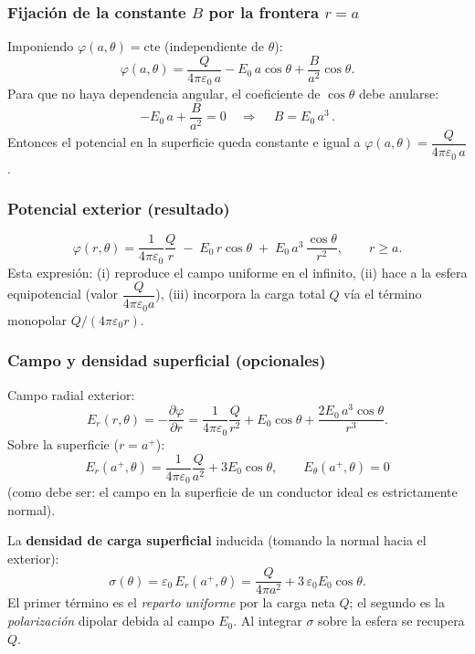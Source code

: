 \documentclass{article}
\begin{document}
\subsubsection*{Fijación de la constante $B$ por la frontera $r=a$}
Imponiendo $\varphi(a,\theta)=\text{cte}$ (independiente de $\theta$):
\[
\varphi(a,\theta)=\frac{Q}{4\pi\varepsilon_0\,a}-E_0\,a\cos\theta+\frac{B}{a^{2}}\cos\theta.
\]
Para que no haya dependencia angular, el coeficiente de $\cos\theta$ debe anularse:
\[
-E_0\,a+\frac{B}{a^{2}}=0\quad\Longrightarrow\quad \boxed{\,B=E_0\,a^{3}\,}.
\]
Entonces el potencial en la superficie queda constante e igual a $\varphi(a,\theta)=\dfrac{Q}{4\pi\varepsilon_0\,a}$.

\subsubsection*{Potencial exterior (resultado)}
\[
\boxed{\;
\varphi(r,\theta)=\frac{1}{4\pi\varepsilon_0}\frac{Q}{r}
\;-\;E_0\,r\cos\theta
\;+\;E_0\,a^{3}\,\frac{\cos\theta}{r^{2}},
\qquad r\ge a.\;}
\]
Esta expresión:
(i) reproduce el campo uniforme en el infinito,
(ii) hace a la esfera equipotencial (valor $\dfrac{Q}{4\pi\varepsilon_0 a}$),
(iii) incorpora la carga total $Q$ vía el término monopolar $Q/(4\pi\varepsilon_0 r)$.

\subsubsection*{Campo y densidad superficial (opcionales)}
Campo radial exterior:
\[
E_r(r,\theta)=-\frac{\partial\varphi}{\partial r}
=\frac{1}{4\pi\varepsilon_0}\frac{Q}{r^{2}}
+E_0\cos\theta
+\frac{2E_0\,a^{3}\cos\theta}{r^{3}}.
\]
Sobre la superficie ($r=a^+$):
\[
E_r(a^+,\theta)=\frac{1}{4\pi\varepsilon_0}\frac{Q}{a^{2}}+3E_0\cos\theta,
\qquad
E_\theta(a^+,\theta)=0
\]
(como debe ser: el campo en la superficie de un conductor ideal es estrictamente normal).

La \textbf{densidad de carga superficial} inducida (tomando la normal hacia el exterior):
\[
\boxed{\;\sigma(\theta)=\varepsilon_0\,E_r(a^+,\theta)
=\frac{Q}{4\pi a^{2}}+3\,\varepsilon_0 E_0\cos\theta.\;}
\]
El primer término es el \emph{reparto uniforme} por la carga neta $Q$; el segundo es la \emph{polarización} dipolar debida al campo $E_0$. Al integrar $\sigma$ sobre la esfera se recupera $Q$.
\end{document}
